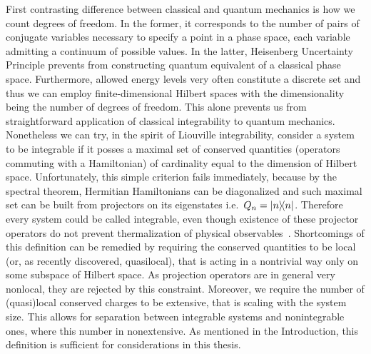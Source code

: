 First contrasting difference between classical and quantum mechanics is how we count
degrees of freedom. In the former, it corresponds to the number of pairs of conjugate variables
necessary to specify a point in a phase space, each variable admitting a continuum of 
possible values. In the latter, Heisenberg Uncertainty Principle prevents from 
constructing quantum equivalent of a classical phase space. Furthermore, allowed energy
levels very often constitute a discrete set and thus we can employ finite-dimensional
Hilbert spaces with the dimensionality being the number of degrees of freedom.
This alone prevents us from straightforward application of classical integrability to quantum
mechanics. Nonetheless we can try, in the spirit of Liouville integrability, consider
a system to be integrable if it posses a maximal set of conserved quantities 
(operators commuting with a Hamiltonian) of cardinality
equal to the dimension of Hilbert space. Unfortunately, this simple criterion fails immediately,
because by the spectral theorem, Hermitian Hamiltonians can be diagonalized and such
maximal set can be built from projectors on its eigenstates i.e.\ \( Q_{n} = \ketbra{n}{n}\).
Therefore every system could be called integrable, even though existence of these projector
operators do not prevent thermalization of physical observables~\autocite{DAlessio2016}.
Shortcomings of this definition can be remedied by requiring the conserved quantities
to be local (or, as recently discovered, quasilocal), that is acting in a nontrivial way
only on some subspace of Hilbert space. As projection operators are in general very nonlocal,
they are rejected by this constraint. Moreover, we require the number of (quasi)local conserved
charges to be extensive, that is scaling with the system size. This allows for 
separation between integrable systems and nonintegrable ones, where this number in nonextensive.
As mentioned in the Introduction, this definition is sufficient for considerations in this
thesis.

